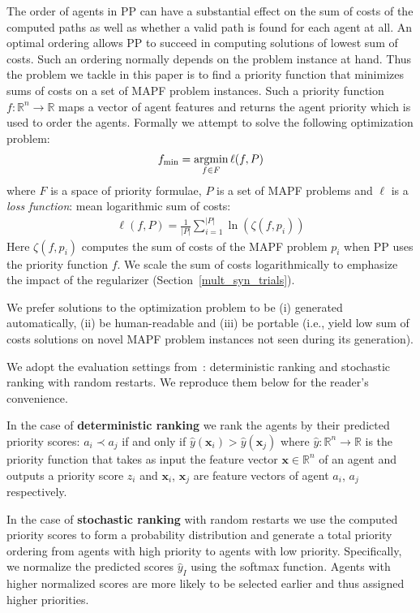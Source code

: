 \documentclass[letterpaper]{article} %
\newcommand{\bea}{\begin{eqnarray}}
\newcommand{\eea}{\end{eqnarray}}
\newcommand{\argmin}{\operatornamewithlimits{argmin}\limits}
\begin{document}
The order of agents in PP can have a substantial effect on the sum of costs of the computed paths as well as whether a valid path is found for each agent at all. An optimal ordering allows PP to succeed in computing solutions of lowest sum of costs. Such an ordering normally depends on the problem instance at hand. Thus the problem we tackle in this paper is to find a priority function that minimizes sums of costs on a set of MAPF problem instances. Such a  priority function $ f : \mathbb{R}^n \rightarrow \mathbb{R} $ maps a vector of agent features and returns the agent priority which is used to order the agents. Formally we attempt to solve the following optimization problem:
\bea
f_{\min} = \argmin_{f \in F} \ell(f, P)
\eea
where $ F $ is a space of priority formulae, $ P $ is a set of MAPF problems and $ \ell $ is a \textit{loss function}: mean logarithmic sum of costs:
\bea
\label{eq:loss}
{
\ell(f, P) = \frac{1}{|P|} \sum^{|P|}_{i = 1}\ln(\zeta(f, p_i))
}
\eea
Here $\zeta(f, p_i)$ computes the sum of costs of the MAPF problem $ p_i $ when PP uses the priority function $ f $. We scale the sum of costs logarithmically to emphasize the impact  of the regularizer (Section~\ref{mult_syn_trials}).

We prefer solutions to the optimization problem to be (i) generated automatically,  (ii) be human-readable and (iii) be portable (i.e., yield low sum of costs solutions on novel MAPF problem instances not seen during its generation).

We adopt the evaluation settings from~\citet{zhang222learning}: deterministic ranking and stochastic ranking with random restarts. We reproduce them below for the reader's convenience.

In the case of \textbf{deterministic ranking} we rank the agents by their predicted priority scores: $ a_i \prec a_j $ if and only if $ \hat{y}(\mathbf{x}_i) > \hat{y}(\mathbf{x}_j) $ where $ \hat{y} : \mathbb{R}^n \rightarrow \mathbb{R} $ is the priority function that takes as input the feature vector $ \mathbf{x} \in \mathbb{R}^n $ of an agent and outputs a priority score $ z_i $ and $ \mathbf{x}_i $, $ \mathbf{x}_j $ are feature vectors of agent $ a_i $, $ a_j $ respectively.

In the case of \textbf{stochastic ranking} with random restarts we use the computed priority scores to form a probability distribution and generate a total priority ordering from agents with high priority to agents with low priority. Specifically, we normalize the predicted scores $ \hat{y}_I $ using the softmax function. Agents with higher normalized scores are more likely to be selected earlier and thus assigned higher priorities.
\end{document}
